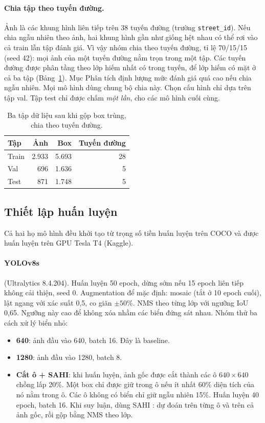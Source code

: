 \paragraph{Chia tập theo tuyến đường.}
Ảnh là các khung hình liên tiếp trên 38 tuyến đường (trường \texttt{street\_id}). Nếu chia ngẫu nhiên theo ảnh, hai khung hình gần như giống hệt nhau có thể rơi vào cả train lẫn tập đánh giá.
Vì vậy nhóm chia theo tuyến đường, tỉ lệ 70/15/15 (seed 42): mọi ảnh của một tuyến đường nằm trọn trong một tập. Các tuyến đường được phân tầng theo lớp hiếm nhất có trong tuyến, để lớp hiếm có mặt ở cả ba tập (Bảng~\ref{tab:split}).
Mục Phân tích định lượng mức đánh giá quá cao nếu chia ngẫu nhiên.
Mọi mô hình dùng chung bộ chia này. Chọn cấu hình chỉ dựa trên tập val. Tập test chỉ được chấm \emph{một lần}, cho các mô hình cuối cùng.

\begin{table}[t]
\centering
\small
\begin{tabular}{lrrr}
\toprule
Tập & Ảnh & Box & Tuyến đường \\
\midrule
Train & 2.933 & 5.693 & 28 \\
Val   &   696 & 1.636 &  5 \\
Test  &   871 & 1.748 &  5 \\
\bottomrule
\end{tabular}
\caption{Ba tập dữ liệu sau khi gộp box trùng, chia theo tuyến đường.}
\label{tab:split}
\end{table}

\subsection{Thiết lập huấn luyện}
\label{sec:setup}

Cả hai họ mô hình đều khởi tạo từ trọng số tiền huấn luyện trên COCO \citep{lin2014coco} và được huấn luyện trên GPU Tesla T4 (Kaggle).

\paragraph{YOLOv8s} \citep{jocher2023ultralytics} (Ultralytics 8.4.204).
Huấn luyện 50 epoch, dừng sớm nếu 15 epoch liên tiếp không cải thiện, seed 0.
Augmentation để mặc định: mosaic (tắt ở 10 epoch cuối), lật ngang với xác suất 0,5, co giãn $\pm 50\%$.
NMS theo từng lớp với ngưỡng IoU 0,65. Ngưỡng này cao để không xóa nhầm các biển đứng sát nhau.
Nhóm thử ba cách xử lý biển nhỏ:
\begin{itemize}
\item \textbf{640}: ảnh đầu vào 640, batch 16. Đây là baseline.
\item \textbf{1280}: ảnh đầu vào 1280, batch 8.
\item \textbf{Cắt ô + SAHI}: khi huấn luyện, ảnh gốc được cắt thành các ô $640 \times 640$ chồng lấp 20\%.
  Một box chỉ được giữ trong ô nếu ít nhất 60\% diện tích của nó nằm trong ô. Các ô không có biển chỉ giữ ngẫu nhiên 15\%.
  Huấn luyện 40 epoch, batch 16.
  Khi suy luận, dùng SAHI \citep{akyon2022sahi}: dự đoán trên từng ô và trên cả ảnh gốc, rồi gộp bằng NMS theo lớp.
\end{itemize}


